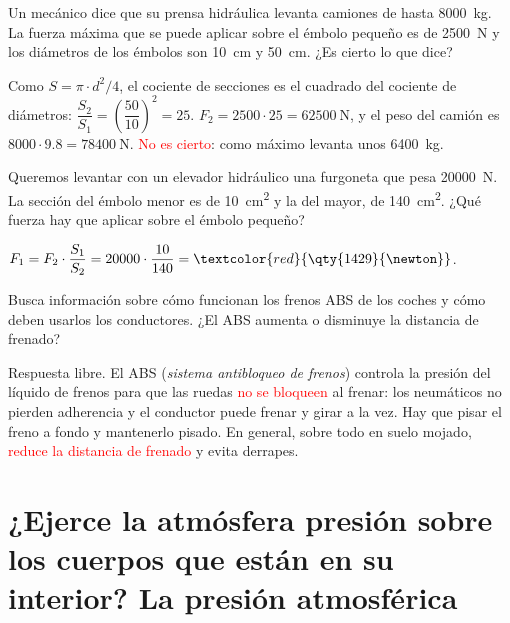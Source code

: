 \begin{exercise}
    Un mecánico dice que su prensa hidráulica levanta camiones de hasta \qty{8000}{\kg}. La fuerza máxima que se puede aplicar sobre el émbolo pequeño es de \qty{2500}{\newton} y los diámetros de los émbolos son \qty{10}{\cm} y \qty{50}{\cm}. ¿Es cierto lo que dice?
    \begin{solu}
        Como \(S = \pi \cdot d^2/4\), el cociente de secciones es el cuadrado del cociente de diámetros: \(\dfrac{S_2}{S_1} = \left(\dfrac{50}{10}\right)^2 = 25\).
        \(F_2 = 2500 \cdot 25 = \qty{62500}{\newton}\), y el peso del camión es \(8000 \cdot \num{9.8} = \qty{78400}{\newton}\). \textcolor{red}{No es cierto}: como máximo levanta unos \qty{6400}{\kg}.
    \end{solu}
\end{exercise}

\begin{exercise}
    Queremos levantar con un elevador hidráulico una furgoneta que pesa \qty{20000}{\newton}. La sección del émbolo menor es de \qty{10}{\square\cm} y la del mayor, de \qty{140}{\square\cm}. ¿Qué fuerza hay que aplicar sobre el émbolo pequeño?
    \begin{solu}
        \(F_1 = F_2 \cdot \dfrac{S_1}{S_2} = 20000 \cdot \dfrac{10}{140} = \textcolor{red}{\qty{1429}{\newton}}\).
    \end{solu}
\end{exercise}

\begin{exercise}
    Busca información sobre cómo funcionan los frenos ABS de los coches y cómo deben usarlos los conductores. ¿El ABS aumenta o disminuye la distancia de frenado?
    \begin{solu}
        Respuesta libre. El ABS (\emph{sistema antibloqueo de frenos}) controla la presión del líquido de frenos para que las ruedas \textcolor{red}{no se bloqueen} al frenar: los neumáticos no pierden adherencia y el conductor puede frenar y girar a la vez. Hay que pisar el freno a fondo y mantenerlo pisado. En general, sobre todo en suelo mojado, \textcolor{red}{reduce la distancia de frenado} y evita derrapes.
    \end{solu}
\end{exercise}

\section[La presión atmosférica]{¿Ejerce la atmósfera presión sobre los cuerpos que están en su interior? La presión atmosférica}

